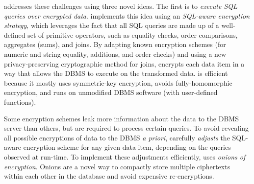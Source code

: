 \name{} addresses these challenges using three novel ideas.  The first
is to {\em execute SQL queries over encrypted data}.  \name{}
implements this idea using an {\em SQL-aware encryption strategy},
which leverages the fact that all SQL queries are made up of a
well-defined set of primitive operators, such as equality checks,
order comparisons, aggregates (sums), and joins.  By adapting known
encryption schemes (for numeric and string equality, additions, and
order checks) and using a new privacy-preserving cryptographic method
for joins, \name{} encrypts each data item in a way that allows the
DBMS to execute on the transformed data.
\name{} is efficient because it mostly uses symmetric-key encryption,
avoids fully-homomorphic encryption, and runs on unmodified DBMS
software (with user-defined functions).

Some encryption schemes leak more information about the data to the
DBMS server than others, but are required to process certain queries.
To avoid revealing all possible encryptions of data to the DBMS {\em a
  priori}, \name carefully {\em adjusts} the SQL-aware encryption
scheme for any given data item, depending on the queries observed at
run-time.  To implement these adjustments efficiently, \name{} uses
{\em onions of encryption}.  Onions are a novel way to compactly store
multiple ciphertexts within each other in the database and avoid
expensive re-encryptions. %





